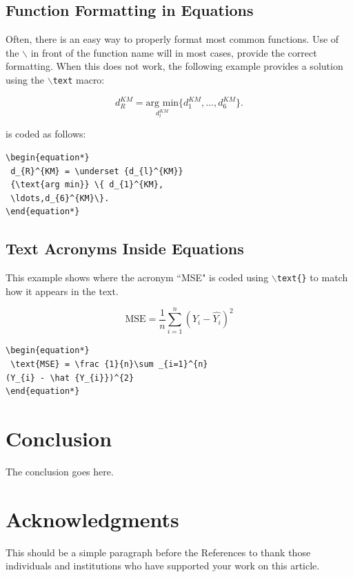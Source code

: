 \documentclass[lettersize,journal]{IEEEtran}
\begin{document}
\subsection{Function Formatting in Equations}
Often, there is an easy way to properly format most common functions. Use of
the $\backslash$ in front of the function name will in most cases, provide the
correct formatting. When this does not work, the following example provides a
solution using the $\backslash${\tt{text}} macro:

\begin{equation*}
  d_{R}^{KM} = \underset {d_{l}^{KM}} {\text{arg min}} \{ d_{1}^{KM},\ldots,d_{6}^{KM}\}.
\end{equation*}

\noindent is coded as follows:
\begin{verbatim}
\begin{equation*} 
 d_{R}^{KM} = \underset {d_{l}^{KM}} 
 {\text{arg min}} \{ d_{1}^{KM},
 \ldots,d_{6}^{KM}\}.
\end{equation*}
\end{verbatim}

\subsection{ Text Acronyms Inside Equations}
This example shows where the acronym ``MSE" is coded using
$\backslash${\tt{text\{\}}} to match how it appears in the text.

\begin{equation*}
  \text{MSE} = \frac {1}{n}\sum _{i=1}^{n}(Y_{i} - \hat {Y_{i}})^{2}
\end{equation*}

\begin{verbatim}
\begin{equation*}
 \text{MSE} = \frac {1}{n}\sum _{i=1}^{n}
(Y_{i} - \hat {Y_{i}})^{2}
\end{equation*}
\end{verbatim}

\section{Conclusion}
The conclusion goes here.

\section*{Acknowledgments}
This should be a simple paragraph before the References to thank those individuals and institutions who have supported your work on this article.
\end{document}
